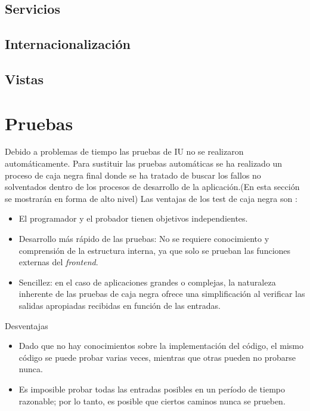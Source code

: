 \subsection{Servicios}

\subsection{Internacionalización}

\subsection{Vistas}


\section{Pruebas}
Debido a problemas de tiempo las pruebas de IU no se realizaron automáticamente. Para sustituir las pruebas automáticas se ha realizado un proceso de caja negra final donde se ha tratado de buscar los fallos no solventados dentro de los procesos de desarrollo de la aplicación.(En esta sección se mostrarán en forma de alto nivel) Las ventajas de los test de caja negra son :

\begin{itemize}
\item El programador y el probador tienen objetivos independientes.
\item Desarrollo más rápido de las pruebas: No se requiere conocimiento y comprensión de la estructura interna, ya que solo se prueban las funciones externas del \textit{frontend}.
\item Sencillez: en el caso de aplicaciones grandes o complejas, la naturaleza inherente de las pruebas de caja negra ofrece una simplificación al verificar las salidas apropiadas recibidas en función de las entradas.
\end{itemize}

Desventajas

\begin{itemize}
\item Dado que no hay conocimientos sobre la implementación del código, el mismo código se puede probar varias veces, mientras que otras pueden no probarse nunca.
\item Es imposible probar todas las entradas posibles en un período de tiempo razonable; por lo tanto, es posible que ciertos caminos nunca se prueben.
\end{itemize}


